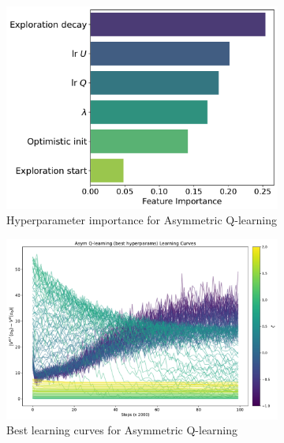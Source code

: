 \begin{figure}
    \centering
    \begin{subfigure}[b]{0.32\textwidth}
        \includegraphics[width=\textwidth]{images/images_part1/hyperparameter_importance_ql_asym.pdf}
        \caption{Hyperparameter importance for Asymmetric Q-learning}
        \label{fig:hyperparam-importance}
    \end{subfigure}
    \hfill
    \begin{subfigure}[b]{0.32\textwidth}
        \includegraphics[width=\textwidth]{images/images_part1/ql_asym_best_learning_curves.pdf}
        \caption{Best learning curves for Asymmetric Q-learning}
        \label{fig:best-learning-curves}
    \end{subfigure}
    \hfill
    \begin{subfigure}[b]{0.32\textwidth}

\end{subfigure}
\end{figure}

